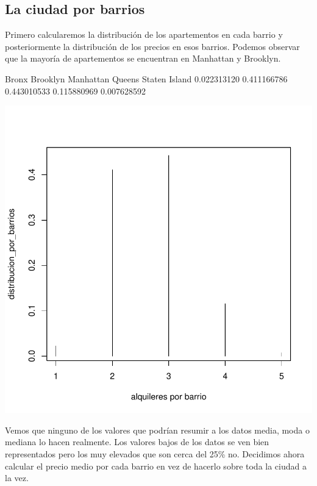 \documentclass [a4paper] {article}
\begin{document}
\subsection{La ciudad por barrios}
Primero calcularemos la distribución de los apartementos en cada barrio y posteriormente la distribución de los precios en esos barrios.
Podemos observar que la mayoría de apartementos se encuentran en Manhattan y Brooklyn.
\begin{Schunk}
\begin{Soutput}
        Bronx      Brooklyn     Manhattan        Queens Staten Island 
  0.022313120   0.411166786   0.443010533   0.115880969   0.007628592 
\end{Soutput}
\end{Schunk}
\includegraphics{entrega-distribucion_barrios_plot}

Vemos que ninguno de los valores que podrían resumir a los datos media, moda o mediana lo hacen realmente.
Los valores bajos de los datos se ven bien representados pero los muy elevados que son cerca del 25\% no.
Decidimos ahora calcular el precio medio por cada barrio en vez de hacerlo sobre toda la ciudad a la vez.
\end{document}
